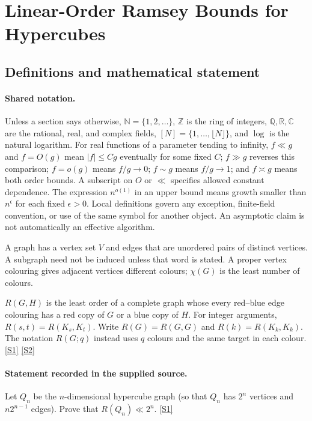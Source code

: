 \documentclass[11pt,a4paper]{article}
\newcommand{\N}{\mathbb{N}}
\newcommand{\Z}{\mathbb{Z}}
\newcommand{\Q}{\mathbb{Q}}
\newcommand{\R}{\mathbb{R}}
\newcommand{\C}{\mathbb{C}}
\newcommand{\sref}[2]{\hyperlink{source:#1:#2}{[S#2]}}
\begin{document}
\section{Linear-Order Ramsey Bounds for Hypercubes}\label{statement}


\subsection{Definitions and mathematical statement}

\paragraph{Shared notation.}Unless a section says otherwise, $\N=\{1,2,\ldots\}$,
$\Z$ is the ring of integers, $\Q,\R,\C$ are the rational, real, and complex
fields, $[N]=\{1,\ldots,\lfloor N\rfloor\}$, and $\log$ is the natural
logarithm. For real functions of a parameter tending to infinity,
$f\ll g$ and $f=O(g)$ mean $|f|\leq Cg$ eventually for some fixed $C$;
$f\gg g$ reverses this comparison; $f=o(g)$ means $f/g\to0$;
$f\sim g$ means $f/g\to1$; and $f\asymp g$ means both order bounds.
A subscript on $O$ or $\ll$ specifies allowed constant dependence.
The expression $n^{o(1)}$ in an upper bound means growth smaller than
$n^\epsilon$ for each fixed $\epsilon>0$. Local definitions govern any
exception, finite-field convention, or use of the same symbol for another
object. An asymptotic claim is not automatically an effective algorithm.



A graph has a vertex set $V$ and edges that are unordered pairs of distinct vertices. A subgraph need not be induced unless that word is stated. A proper vertex colouring gives adjacent vertices different colours; $\chi(G)$ is the least number of colours.

$R(G,H)$ is the least order of a complete graph whose every red--blue edge colouring has a red copy of $G$ or a blue copy of $H$. For integer arguments, $R(s,t)=R(K_s,K_t)$. Write $R(G)=R(G,G)$ and $R(k)=R(K_k,K_k)$. The notation $R(G;q)$ instead uses $q$ colours and the same target in each colour. \sref{statement}{1} \sref{statement}{2}

\paragraph{Statement recorded in the supplied source.}
Let $Q_n$ be the $n$-dimensional hypercube graph (so that $Q_n$ has $2^n$ vertices and $n2^{n-1}$ edges). Prove that $ R(Q_n) \ll 2^n. $ \sref{statement}{1}
\end{document}

